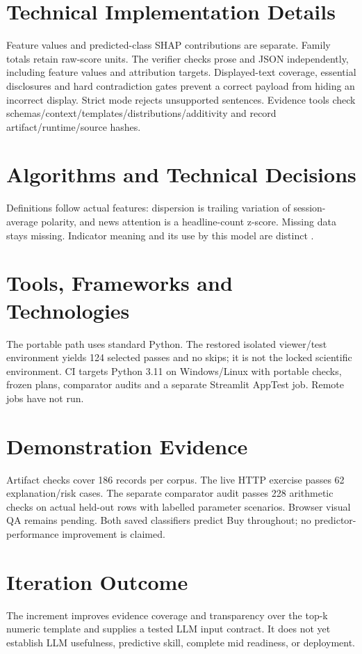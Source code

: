 \section{Technical Implementation Details}
Feature values and predicted-class SHAP contributions are separate. Family totals retain raw-score units. The verifier checks prose and JSON independently, including feature values and attribution targets. Displayed-text coverage, essential disclosures and hard contradiction gates prevent a correct payload from hiding an incorrect display. Strict mode rejects unsupported sentences. Evidence tools check schemas/context/templates/distributions/additivity and record artifact/runtime/source hashes.

\section{Algorithms and Technical Decisions}
Definitions follow actual features: dispersion is trailing variation of session-average polarity, and news attention is a headline-count z-score. Missing data stays missing. Indicator meaning and its use by this model are distinct \cite{fidelity_rsi,fidelity_macd,fidelity_obv}.

\section{Tools, Frameworks and Technologies}
The portable path uses standard Python. The restored isolated viewer/test environment yields 124 selected passes and no skips; it is not the locked scientific environment. CI targets Python 3.11 on Windows/Linux with portable checks, frozen plans, comparator audits and a separate Streamlit AppTest job. Remote jobs have not run.

\section{Demonstration Evidence}
Artifact checks cover 186 records per corpus. The live HTTP exercise passes 62 explanation/risk cases. The separate comparator audit passes 228 arithmetic checks on actual held-out rows with labelled parameter scenarios. Browser visual QA remains pending. Both saved classifiers predict Buy throughout; no predictor-performance improvement is claimed.

\section{Iteration Outcome}
The increment improves evidence coverage and transparency over the top-k numeric template and supplies a tested LLM input contract. It does not yet establish LLM usefulness, predictive skill, complete mid readiness, or deployment.
